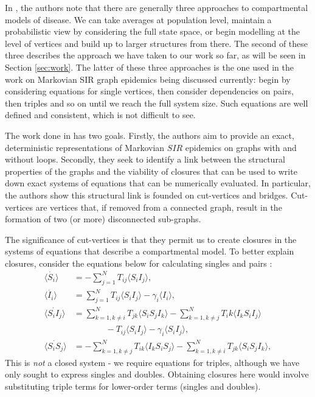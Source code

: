 \documentclass[../report.tex]{subfiles}
\begin{document}
In \cite{kiss_2014}, the authors note that there are generally three approaches to compartmental models of disease. We can take averages at population level, maintain a probabilistic view by considering the full state space, or begin modelling at the level of vertices and build up to larger structures from there. The second of these three describes the approach we have taken to our work so far, as will be seen in Section \ref{sec:work}. The latter of these three approaches is the one used in the work on Markovian SIR graph epidemics being discussed currently: begin by considering equations for single vertices, then consider dependencies on pairs, then triples and so on until we reach the full system size. Such equations are well defined and consistent, which is not difficult to see.

The work done in \cite{kiss_2014} has two goals. Firstly, the authors aim to provide an exact, deterministic representations of Markovian $SIR$ epidemics on graphs with and without loops. Secondly, they seek to identify a link between the structural properties of the graphs and the viability of closures that can be used to write down exact systems of equations that can be numerically evaluated. In particular, the authors show this structural link is founded on cut-vertices and bridges. Cut-vertices are vertices that, if removed from a connected graph, result in the formation of two (or more) disconnected sub-graphs.

The significance of cut-vertices is that they permit us to create closures in the systems of equations that describe a compartmental model. To better explain closures, consider the equations below for calculating singles and pairs \cite{kiss_2014}:
\begin{align*}
\langle \dot{S_i} \rangle & = -\sum^N_{j=1}T_{ij}\langle S_iI_j\rangle,\\
\langle\dot{I_i}\rangle & = \sum^N_{j=1}T_{ij}\langle S_iI_j\rangle - \gamma_i\langle I_i \rangle,\\
\langle\dot{S_iI_j}\rangle & = \sum^N_{k=1,k\neq i}T_{jk}\langle S_i S_j I_k \rangle - \sum^N_{k=1,k\neq j}T_ik\langle I_k S_i I_j \rangle \\ 
			    	      & ~~~~~~~~~~~~~~~~~- T_{ij}\langle S_iI_j \rangle - \gamma_i\langle S_i I_j \rangle,\\
\langle \dot{S_i S_j}\rangle & = - \sum^N_{k=1,k\neq j}T_{ik}\langle I_k S_i S_j \rangle - \sum^N_{k=1,k\neq i}T_{jk}\langle S_i S_j I_k \rangle,
\end{align*}
This is {\it not} a closed system - we require equations for triples, although we have only sought to express singles and doubles. Obtaining closures here would involve substituting triple terms for lower-order terms (singles and doubles).
\end{document}
